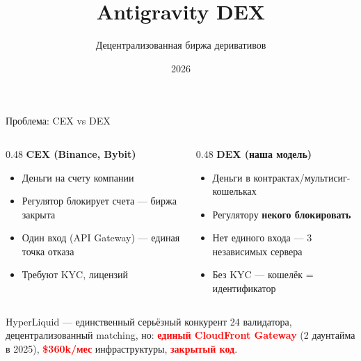 \documentclass[aspectratio=169]{beamer}
\title{Antigravity DEX}
\subtitle{Децентрализованная биржа деривативов}
\date{2026}
\begin{document}
\begin{frame}
\maketitle
{}
\end{frame}

\begin{frame}{Проблема: CEX vs DEX}

\begin{columns}[t]
\begin{column}{0.48\textwidth}
\textbf{CEX (Binance, Bybit)}
\begin{itemize}
    \item Деньги на счету компании
    \item Регулятор блокирует счета --- биржа закрыта
    \item Один вход (API Gateway) --- единая точка отказа
    \item Требуют KYC, лицензий
\end{itemize}
\end{column}
\begin{column}{0.48\textwidth}
\textbf{DEX (наша модель)}
\begin{itemize}
    \item Деньги в контрактах/\newline мультисиг-кошельках
    \item Регулятору \textbf{некого блокировать}
    \item Нет единого входа --- 3 независимых сервера
    \item Без KYC --- кошелёк = идентификатор
\end{itemize}
\end{column}
\end{columns}

\vspace{0.5em}
\begin{block}{HyperLiquid --- единственный серьёзный конкурент}
24 валидатора, децентрализованный matching, но:
\textcolor{red}{\textbf{единый CloudFront Gateway}} (2 даунтайма в 2025),
\textcolor{red}{\textbf{\$360k/мес}} инфраструктуры, \textcolor{red}{\textbf{закрытый код}}.
\end{block}
\end{frame}
\end{document}
